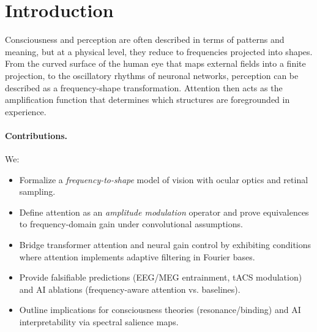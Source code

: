 \documentclass[12pt]{article}
\begin{document}
\section{Introduction}
%
%
Consciousness and perception are often described in terms of patterns and meaning, but at a physical level, they reduce to frequencies projected into shapes. From the curved surface of the human eye that maps external fields into a finite projection, to the oscillatory rhythms of neuronal networks, perception can be described as a frequency-shape transformation. Attention then acts as the amplification function that determines which structures are foregrounded in experience.

\paragraph{Contributions.} We:
\begin{itemize}[leftmargin=*]
  \item Formalize a \emph{frequency-to-shape} model of vision with ocular optics and retinal sampling.
  \item Define attention as an \emph{amplitude modulation} operator and prove equivalences to frequency-domain gain under convolutional assumptions.
  \item Bridge transformer attention and neural gain control by exhibiting conditions where attention implements adaptive filtering in Fourier bases.
  \item Provide falsifiable predictions (EEG/MEG entrainment, tACS modulation) and AI ablations (frequency-aware attention vs. baselines).
  \item Outline implications for consciousness theories (resonance/binding) and AI interpretability via spectral salience maps.
\end{itemize}
\end{document}
